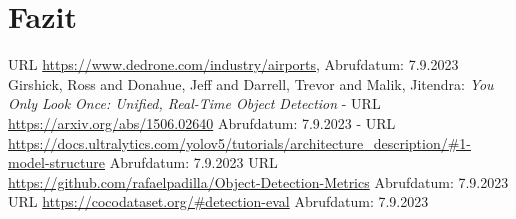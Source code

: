 \documentclass[runningheads]{llncs}
\begin{document}
\section{Fazit}

\begin{thebibliography}{3}

URL \url{https://www.dedrone.com/industry/airports}, Abrufdatum: 7.9.2023
Girshick, Ross and Donahue, Jeff and Darrell, Trevor and Malik, Jitendra: \textit{You Only Look Once: Unified, Real-Time Object Detection} 
 - URL \url{https://arxiv.org/abs/1506.02640}
 Abrufdatum: 7.9.2023
 - URL \url{ https://docs.ultralytics.com/yolov5/tutorials/architecture_description/#1-model-structure}
 Abrufdatum: 7.9.2023
URL \url{https://github.com/rafaelpadilla/Object-Detection-Metrics}
Abrufdatum: 7.9.2023
 URL \url{https://cocodataset.org/\#detection-eval}
 Abrufdatum: 7.9.2023

\end{thebibliography}
\end{document}
